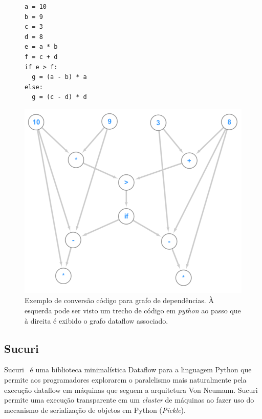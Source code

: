 \begin{figure}
    \centering
    \begin{minipage}{.3\textwidth}
        \centering
\begin{verbatim}
a = 10
b = 9
c = 3
d = 8
e = a * b
f = c + d
if e > f:
  g = (a - b) * a
else:
  g = (c - d) * d
\end{verbatim}
    \end{minipage}
    \begin{minipage}{.675\textwidth}
        \centering %
        \includegraphics[scale=.7]{figuras/dataflow/pythonCodeDf.png}
    \end{minipage}
    \caption{Exemplo de conversão código para grafo de dependências.
    À esquerda pode ser visto um trecho de código em \emph{python} ao passo que à direita é exibido o grafo dataflow associado.}
    \label{fig:dataflowExemploPython}
\end{figure}

\subsection{Sucuri} \label{sect:sucuri}

Sucuri~\cite{sucuri-original} é uma biblioteca minimalística Dataflow para a linguagem Python que permite aos programadores explorarem o paralelismo mais naturalmente pela execução dataflow em máquinas que seguem a arquitetura Von Neumann.
Sucuri permite uma execução transparente em um \emph{cluster} de máquinas ao fazer uso do mecanismo de serialização de objetos em Python (\emph{Pickle}).

